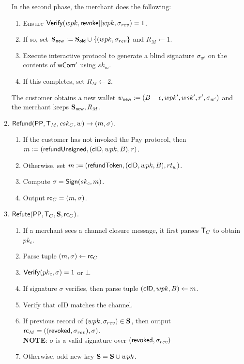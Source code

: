 \documentclass[11pt]{report}
\begin{document}
\begin{enumerate}
\medskip \noindent
In the second phase, the merchant does the following:
\begin{enumerate}
\item Ensure ${\sf Verify}(wpk, {\sf revoke}||wpk, \sigma_{rev}) = 1$. 
\item If so, set ${\bf S}_{\sf new} := {\bf S}_{\sf old} \cup \{(wpk, \sigma_{rev}\}$ and $R_{M} \leftarrow 1$.
\item Execute interactive protocol to generate a blind signature $\sigma_{w'}$ on the contents of ${\sf wCom'}$ using $sk_m$. 
\item If this completes, set $R_{M} \leftarrow 2$.
\end{enumerate}

\medskip \noindent
The customer obtains a new wallet $w_{\sf new} := (B - \epsilon, wpk', wsk', r', \sigma_{w'})$ and the merchant keeps ${\bf S}_{\sf new}, R_{M}$.


\item ${\sf Refund}({\sf PP}, {\sf T}_{M}, csk_{C}, w) \rightarrow (m, \sigma)$. 
\begin{enumerate}
\item If the customer has not invoked the {\sf Pay} protocol, then $m := ({\sf refundUnsigned}, ({\sf cID}, wpk, B), r)$.
\item Otherwise, set $m := ({\sf refundToken}, ({\sf cID}, wpk, B), rt_w)$.
\item Compute $\sigma = {\sf Sign}(sk_c, m)$.
\item Output ${\sf rc}_{C} = (m, \sigma)$.
\end{enumerate}

\item ${\sf Refute}({\sf PP}, {\sf T}_{C}, {\bf S}, {\sf rc}_{C})$.
\begin{enumerate}
\item If a merchant sees a channel closure message, it first parses ${\sf T}_{C}$ to obtain $pk_c$.
\item Parse tuple $(m, \sigma) \leftarrow {\sf rc}_{C}$ 
\item ${\sf Verify}(pk_c, \sigma) = 1$ or $\bot$ 
\item If signature $\sigma$ verifies, then parse tuple $({\sf cID}, wpk, B) \leftarrow m$.
\item Verify that {\sf cID} matches the channel.
\item If previous record of $(wpk, \sigma_{rev}) \in {\bf S}$, then output ${\sf rc}_{M} = (({\sf revoked}, \sigma_{rev}), \sigma)$.
\\ {\bf NOTE}: $\sigma$ is a valid signature over $({\sf revoked}, \sigma_{rev})$
\item Otherwise, add new key ${\bf S} = {\bf S} \cup wpk$.
\end{enumerate}


\end{enumerate}
\end{document}

